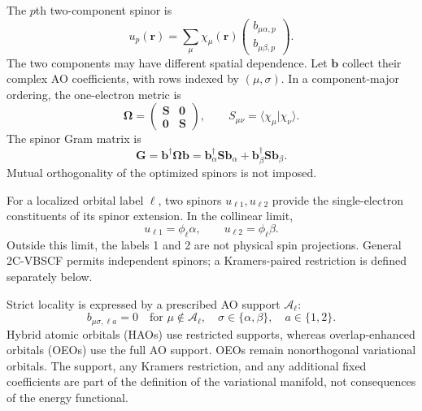 \documentclass[12pt]{article}
\begin{document}
The \(p\)th two-component spinor is
\begin{equation}
 u_p(\mathbf r)=\sum_\mu\chi_\mu(\mathbf r)
 \begin{pmatrix}b_{\mu\alpha,p}\\b_{\mu\beta,p}\end{pmatrix}.
 \label{eq:spinor}
\end{equation}
The two components may have different spatial dependence. Let \(\mathbf b\) collect their complex AO coefficients, with rows indexed by \((\mu,\sigma)\). In a component-major ordering, the one-electron metric is
\begin{equation}
 \boldsymbol\Omega=
 \begin{pmatrix}\mathbf S&\mathbf 0\\\mathbf 0&\mathbf S\end{pmatrix},
 \qquad S_{\mu\nu}=\langle\chi_\mu|\chi_\nu\rangle.
 \label{eq:aometric}
\end{equation}
The spinor Gram matrix is
\begin{equation}
 \mathbf G=\mathbf b^\dagger\boldsymbol\Omega\mathbf b
 =\mathbf b_\alpha^\dagger\mathbf S\mathbf b_\alpha
  +\mathbf b_\beta^\dagger\mathbf S\mathbf b_\beta.
 \label{eq:gram}
\end{equation}
Mutual orthogonality of the optimized spinors is not imposed.

For a localized orbital label \(\ell\), two spinors \(u_{\ell 1},u_{\ell 2}\) provide the single-electron constituents of its spinor extension. In the collinear limit,
\begin{equation}
 u_{\ell 1}=\phi_\ell\alpha,
 \qquad u_{\ell 2}=\phi_\ell\beta.
 \label{eq:collinear}
\end{equation}
Outside this limit, the labels 1 and 2 are not physical spin projections. General 2C-VBSCF permits independent spinors; a Kramers-paired restriction is defined separately below.

Strict locality is expressed by a prescribed AO support \(\mathcal A_\ell\):
\begin{equation}
 b_{\mu\sigma,\ell a}=0
 \quad\text{for }\mu\notin\mathcal A_\ell,
 \quad \sigma\in\{\alpha,\beta\},\quad a\in\{1,2\}.
 \label{eq:support}
\end{equation}
Hybrid atomic orbitals (HAOs) use restricted supports, whereas overlap-enhanced orbitals (OEOs) use the full AO support. OEOs remain nonorthogonal variational orbitals. The support, any Kramers restriction, and any additional fixed coefficients are part of the definition of the variational manifold, not consequences of the energy functional.
\end{document}
